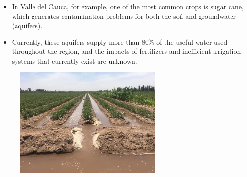 \begin{frame}
	\frametitle{\secname}
	\begin{minipage}{0.5\textwidth}
		\begin{itemize}
			\item In Valle del Cauca, for example, one of the most 
			common crops is sugar cane, which generates contamination 
			problems for both the soil and groundwater (aquifers).
			\item Currently, these aquifers supply more than 80\% 
			of the useful water used throughout the region, 
			and the impacts of fertilizers and inefficient irrigation 
			systems that currently exist are unknown.

		\end{itemize}
	\end{minipage}
	\begin{minipage}{0.47\textwidth}
		\begin{figure}[ht!]
			\centering
			\includegraphics[height=5.5cm]{water_waster2}
		\end{figure}
	\end{minipage}
\end{frame}
